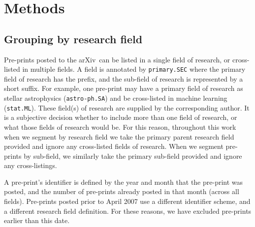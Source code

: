 \documentclass[a4paper,12pt]{article}
\newcommand{\arxiv}{arXiv}
\begin{document}






\newpage




\section*{Methods}

\subsection*{Grouping by research field}

Pre-prints posted to the \arxiv\ can be listed in a single field of research, or cross-listed in multiple fields. A field is annotated by \texttt{primary.SEC} where the primary field of research has the prefix, and the sub-field of research is represented by a short suffix. For example, one pre-print may have a primary field of research as stellar astrophysics (\texttt{astro-ph.SA}) and be cross-listed in machine learning (\texttt{stat.ML}). These field(s) of research are supplied by the corresponding author. It is a subjective decision whether to include more than one field of research, or what those fields of research would be. For this reason, throughout this work when we segment by research field we take the primary parent research field provided and ignore any cross-listed fields of research. When we segment pre-prints by sub-field, we similarly take the primary sub-field provided and ignore any cross-listings.

A pre-print's identifier is defined by the year and month that the pre-print was posted, and the number of pre-prints already posted in that month (across all fields). Pre-prints posted prior to April 2007 use a different identifier scheme, and a different research field definition. For these reasons, we have excluded pre-prints earlier than this date. 
\end{document}
